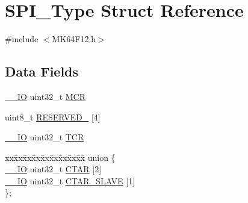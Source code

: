 \hypertarget{struct_s_p_i___type}{}\section{S\+P\+I\+\_\+\+Type Struct Reference}
\label{struct_s_p_i___type}


{\ttfamily \#include $<$M\+K64\+F12.\+h$>$}

\subsection*{Data Fields}
\begin{DoxyCompactItemize}
\item 
\mbox{\hyperlink{core__cm4_8h_aec43007d9998a0a0e01faede4133d6be}{\+\_\+\+\_\+\+IO}} uint32\+\_\+t \mbox{\hyperlink{group___v_r_e_f___peripheral___access___layer_ga27af4e9f888f0b7b1e8da7e002d98798}{M\+CR}}
\item 
uint8\+\_\+t \mbox{\hyperlink{group___v_r_e_f___peripheral___access___layer_ga71277aaa40be4473ac2521981f273bd3}{R\+E\+S\+E\+R\+V\+E\+D\+\_}} \mbox{[}4\mbox{]}
\item 
\mbox{\hyperlink{core__cm4_8h_aec43007d9998a0a0e01faede4133d6be}{\+\_\+\+\_\+\+IO}} uint32\+\_\+t \mbox{\hyperlink{group___v_r_e_f___peripheral___access___layer_gae9dd9282fab299d0cd6e119564688e53}{T\+CR}}
\item 
\begin{tabbing}
xx\=xx\=xx\=xx\=xx\=xx\=xx\=xx\=xx\=\kill
union \{\\
\>\mbox{\hyperlink{core__cm4_8h_aec43007d9998a0a0e01faede4133d6be}{\_\_IO}} uint32\_t \mbox{\hyperlink{group___v_r_e_f___peripheral___access___layer_ga90305b1c98db19c193acfe3f454523bd}{CTAR}} \mbox{[}2\mbox{]}\\
\>\mbox{\hyperlink{core__cm4_8h_aec43007d9998a0a0e01faede4133d6be}{\_\_IO}} uint32\_t \mbox{\hyperlink{group___v_r_e_f___peripheral___access___layer_ga8203e168b85b6c31c5b2bbda76d37e75}{CTAR\_SLAVE}} \mbox{[}1\mbox{]}\\
\}; \\


\end{tabbing}
\end{DoxyCompactItemize}
